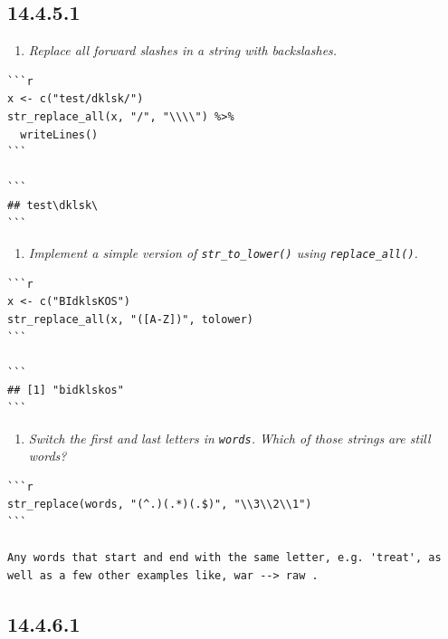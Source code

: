 \documentclass[]{book}
\providecommand{\tightlist}{%
  \setlength{\itemsep}{0pt}\setlength{\parskip}{0pt}}
\theoremstyle{definition}
\theoremstyle{definition}
\theoremstyle{definition}
\theoremstyle{remark}
\begin{document}
\hypertarget{section-49}{%
\subsection{14.4.5.1}\label{section-49}}

\begin{enumerate}
\def\labelenumi{\arabic{enumi}.}
\tightlist
\item
  \emph{Replace all forward slashes in a string with backslashes.}
\end{enumerate}

\begin{verbatim}
```r
x <- c("test/dklsk/")
str_replace_all(x, "/", "\\\\") %>% 
  writeLines()
```

```
## test\dklsk\
```
\end{verbatim}

\begin{enumerate}
\def\labelenumi{\arabic{enumi}.}
\tightlist
\item
  \emph{Implement a simple version of \texttt{str\_to\_lower()} using
  \texttt{replace\_all()}.}
\end{enumerate}

\begin{verbatim}
```r
x <- c("BIdklsKOS")
str_replace_all(x, "([A-Z])", tolower)
```

```
## [1] "bidklskos"
```
\end{verbatim}

\begin{enumerate}
\def\labelenumi{\arabic{enumi}.}
\tightlist
\item
  \emph{Switch the first and last letters in \texttt{words}. Which of
  those strings} \emph{are still words?}
\end{enumerate}

\begin{verbatim}
```r
str_replace(words, "(^.)(.*)(.$)", "\\3\\2\\1")
```

Any words that start and end with the same letter, e.g. 'treat', as well as a few other examples like, war --> raw .
\end{verbatim}

\hypertarget{section-50}{%
\subsection{14.4.6.1}\label{section-50}}
\end{document}
